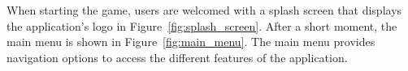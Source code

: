When starting the game, users are welcomed with a splash screen that displays the application's logo in Figure~\ref{fig:splash_screen}. After a short moment, the main menu is shown in Figure~\ref{fig:main_menu}. The main menu provides navigation options to access the different features of the application.
\begin{figure}[ht!]
    \centering
    \begin{subfigure}[b]{0.27\textwidth}
        \centering

\end{subfigure}
\end{figure}

